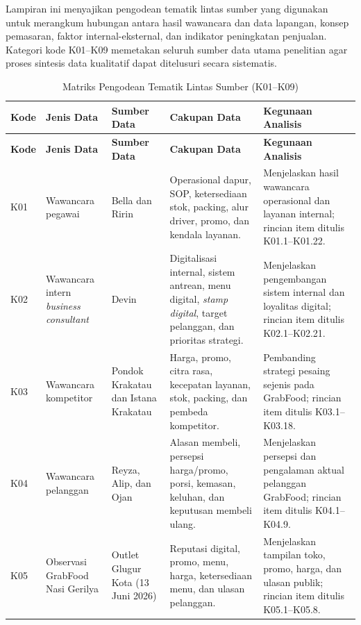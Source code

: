 \label{app:pengodean-tematik-lintas-sumber}

Lampiran ini menyajikan pengodean tematik lintas sumber yang digunakan untuk merangkum hubungan antara hasil wawancara dan data lapangan, konsep pemasaran, faktor internal-eksternal, dan indikator peningkatan penjualan. Kategori kode K01--K09 memetakan seluruh sumber data utama penelitian agar proses sintesis data kualitatif dapat ditelusuri secara sistematis.

\begingroup
\scriptsize
\begin{xltabular}{\textwidth}{|C{1.0cm}|Z{2.8cm}|Z{2.4cm}|Y|L{3.6cm}|}
\caption{Matriks Pengodean Tematik Lintas Sumber (K01--K09)}
\label{tab:matriks-pengodean-tematik-k01-k09}\\
\toprule
\textbf{Kode} & \textbf{Jenis Data} & \textbf{Sumber Data} & \textbf{Cakupan Data} & \textbf{Kegunaan Analisis} \\ \hline
\midrule
\endfirsthead
{}
\toprule
\textbf{Kode} & \textbf{Jenis Data} & \textbf{Sumber Data} & \textbf{Cakupan Data} & \textbf{Kegunaan Analisis} \\ \hline
\midrule
\endhead
{}
\endfoot
\bottomrule
\endlastfoot
K01 & Wawancara pegawai & Bella dan Ririn & Operasional dapur, SOP, ketersediaan stok, packing, alur driver, promo, dan kendala layanan. & Menjelaskan hasil wawancara operasional dan layanan internal; rincian item ditulis K01.1--K01.22. \\ \hline
K02 & Wawancara intern \textit{business consultant} & Devin & Digitalisasi internal, sistem antrean, menu digital, \textit{stamp digital}, target pelanggan, dan prioritas strategi. & Menjelaskan pengembangan sistem internal dan loyalitas digital; rincian item ditulis K02.1--K02.21. \\ \hline
K03 & Wawancara kompetitor & Pondok Krakatau dan Istana Krakatau & Harga, promo, citra rasa, kecepatan layanan, stok, packing, dan pembeda kompetitor. & Pembanding strategi pesaing sejenis pada GrabFood; rincian item ditulis K03.1--K03.18. \\ \hline
K04 & Wawancara pelanggan & Reyza, Alip, dan Ojan & Alasan membeli, persepsi harga/promo, porsi, kemasan, keluhan, dan keputusan membeli ulang. & Menjelaskan persepsi dan pengalaman aktual pelanggan GrabFood; rincian item ditulis K04.1--K04.9. \\ \hline
K05 & Observasi GrabFood Nasi Gerilya & Outlet Glugur Kota (13 Juni 2026) & Reputasi digital, promo, menu, harga, ketersediaan menu, dan ulasan pelanggan. & Menjelaskan tampilan toko, promo, harga, dan ulasan publik; rincian item ditulis K05.1--K05.8. \\ \hline

\end{xltabular}
